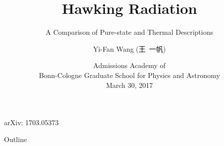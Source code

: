 \documentclass{beamer}
\title%
{Hawking Radiation}
\subtitle{A Comparison of Pure-state and Thermal Descriptions}
\author[Wang] %
{Yi-Fan Wang (王\ 一帆)}
\institute[Uni zu Köln] %
{
  Institut für Theoretische Physik \\
  Universität zu Köln
  \and
  Rheinische Friedrich-Wilhelms-Universität Bonn}
\date[BCGS Admission 2017]
{Admissions Academy of\\Bonn-Cologne Graduate School for Physics and 
Astronomy\\March 30, 2017}
\begin{document}
\begin{frame}
  \titlepage
  arXiv: 1703.05373
\end{frame}

\begin{frame}{Outline}
  \tableofcontents
\end{frame}









\end{document}
